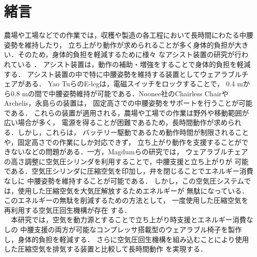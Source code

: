 \section{緒言}
農場や工場などでの作業では，収穫や製造の各工程において長時間にわたる中腰姿勢を維持したり，
立ち上がり動作が求められることが多く身体的負担が大きい．そのため，身体的負担を軽減するために様々
なアシスト装置の研究が行われている
\cite{power2}\cite{every}\cite{HAL}\cite{BLEEX}．
アシスト装置は，動作の補助・増強をすることで身体的負担を軽減する．
アシスト装置の中で特に中腰姿勢を維持する装置としてウェアラブルチェアがある．
Yao TuらのE-legは，電磁スイッチをロックすることで，
0.4 mから0.8 mの間で中腰姿勢維持が可能である\cite{yao}．Noonee社のChairless ChairやArchelis，永島らの装置は，
固定高さでの中腰姿勢をサポートを行うことが可能である\cite{noonee}\cite{osada1}\cite{kinki}．
これらの装置が適用される，農場や工場での作業は野外や移動範囲が広い場合が多く，
電源を得ることが困難であるため，長時間動作が求められる．しかし，これらは，
バッテリー駆動であるため動作時間が制限されることや，固定高さでの作業にしか対応できず，
立ち上がり動作を支援することができないなどの問題がある．一方，Magdumらの研究では，
ウェアラブルチェアの高さ調整に空気圧シリンダを利用することで，中腰支援と立ち上がりが
可能である．空気圧シリンダに圧縮空気を印加し，弁を閉じることでエネルギー消費なしに
中腰姿勢を維持することが可能である\cite{nita}．
しかし，この空気圧システムでは，使用した圧縮空気を大気圧解放するためエネルギーが
無駄になっている．このエネルギーの無駄を削減するための方法として，
一度使用した圧縮空気を再利用する空気圧回生機構が存在
する\cite{kuma}\cite{sasaki}．\\
　本研究では，空気を動力源とすることで立ち上がり時支援とエネルギー消費なしの
中腰支援の両方が可能なコンプレッサ搭載型のウェアラブル椅子を製作し，身体的負担を軽減する．
さらに空気圧回生機構を組み込むことにより使用した圧縮空気を排気する装置と比較して長時間動作
を実現する．